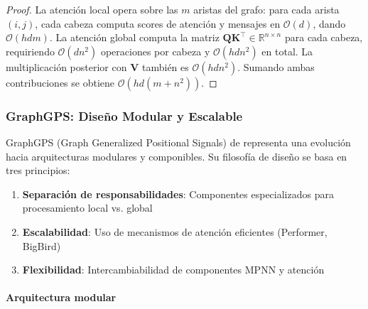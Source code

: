 \begin{proof}
La atención local opera sobre las $m$ aristas del grafo: para cada arista $(i,j)$, cada cabeza computa scores de atención y mensajes en $\mathcal{O}(d)$, dando $\mathcal{O}(hdm)$. La atención global computa la matriz $\mathbf{Q}\mathbf{K}^\top \in \mathbb{R}^{n \times n}$ para cada cabeza, requiriendo $\mathcal{O}(dn^2)$ operaciones por cabeza y $\mathcal{O}(hdn^2)$ en total. La multiplicación posterior con $\mathbf{V}$ también es $\mathcal{O}(hdn^2)$. Sumando ambas contribuciones se obtiene $\mathcal{O}(hd(m + n^2))$.
\end{proof}

\subsubsection{GraphGPS: Diseño Modular y Escalable}\label{subsubsec:graphgps_advanced}

GraphGPS (Graph Generalized Positional Signals) de \citet{rampasek2022graphgps} representa una evolución hacia arquitecturas modulares y componibles. Su filosofía de diseño se basa en tres principios:

\begin{enumerate}
    \item \textbf{Separación de responsabilidades}: Componentes especializados para procesamiento local vs. global
    \item \textbf{Escalabilidad}: Uso de mecanismos de atención eficientes (Performer, BigBird)
    \item \textbf{Flexibilidad}: Intercambiabilidad de componentes MPNN y atención
\end{enumerate}

\paragraph{Arquitectura modular}

